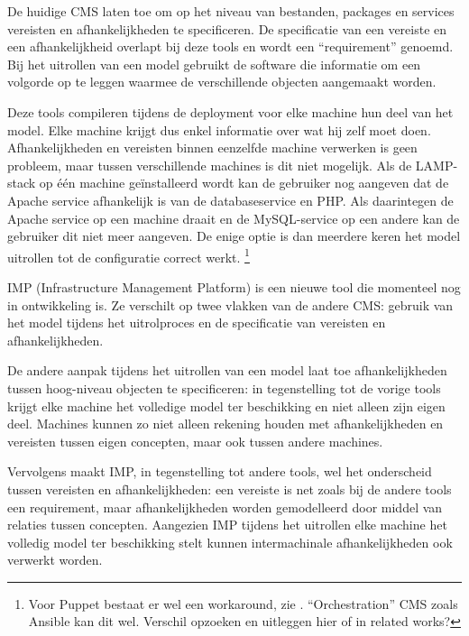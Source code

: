 De huidige CMS laten toe om op het niveau van bestanden, packages en services vereisten en afhankelijkheden te specificeren.
De specificatie van een vereiste en een afhankelijkheid overlapt bij deze tools en wordt een ``requirement'' genoemd.
Bij het uitrollen van een model gebruikt de software die informatie om een volgorde op te leggen waarmee de verschillende objecten aangemaakt worden.

Deze tools compileren tijdens de deployment voor elke machine hun deel van het model.
Elke machine krijgt dus enkel informatie over wat hij zelf moet doen.
Afhankelijkheden en vereisten binnen eenzelfde machine verwerken is geen probleem, maar tussen verschillende machines is dit niet mogelijk.
Als de LAMP-stack op \'e\'en machine ge\"installeerd wordt kan de gebruiker nog aangeven dat de Apache service afhankelijk is van de databaseservice en PHP.
Als daarintegen de Apache service op een machine draait en de MySQL-service op een andere kan de gebruiker dit niet meer aangeven.
De enige optie is dan meerdere keren het model uitrollen tot de configuratie correct werkt.
\footnote{Voor Puppet bestaat er wel een workaround, zie \cite{puppet-orchestration}. ``Orchestration'' CMS zoals Ansible kan dit wel.  Verschil opzoeken en uitleggen hier of in related works?}

IMP (Infrastructure Management Platform) is een nieuwe tool die momenteel nog in ontwikkeling is.
Ze verschilt op twee vlakken van de andere CMS: gebruik van het model tijdens het uitrolproces en de specificatie van vereisten en afhankelijkheden.%

De andere aanpak tijdens het uitrollen van een model laat toe afhankelijkheden tussen hoog-niveau objecten te specificeren:
in tegenstelling tot de vorige tools krijgt elke machine het volledige model ter beschikking en niet alleen zijn eigen deel.
Machines kunnen zo niet alleen rekening houden met afhankelijkheden en vereisten tussen eigen concepten, maar ook tussen andere machines.

Vervolgens maakt IMP, in tegenstelling tot andere tools, wel het onderscheid tussen vereisten en afhankelijkheden:
een vereiste is net zoals bij de andere tools een requirement, maar afhankelijkheden worden gemodelleerd door middel van relaties tussen concepten.
Aangezien IMP tijdens het uitrollen elke machine het volledig model ter beschikking stelt kunnen intermachinale afhankelijkheden ook verwerkt worden.

